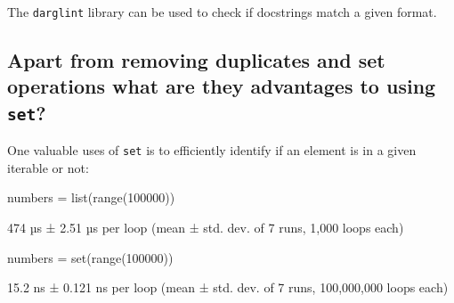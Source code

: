The \texttt{darglint} library can be used
to check if docstrings match a given format.


\subsection{Apart from removing duplicates and set operations what are they advantages to using \texttt{set}?}
\label{\detokenize{building-tools/02-functions-and-data-structures/why/main:a-part-from-removing-duplicates-and-set-operations-what-are-they-advantages-to-using-set}}

One valuable uses of \texttt{set} is to efficiently identify if an element
is in a given iterable or not:

\begin{pyin}
numbers = list(range(100000))
\end{pyin}





\begin{raw}
474 µs ± 2.51 µs per loop (mean ± std. dev. of 7 runs, 1,000 loops each)
\end{raw}



\begin{pyin}
numbers = set(range(100000))
\end{pyin}





\begin{raw}
15.2 ns ± 0.121 ns per loop (mean ± std. dev. of 7 runs, 100,000,000 loops each)
\end{raw}
